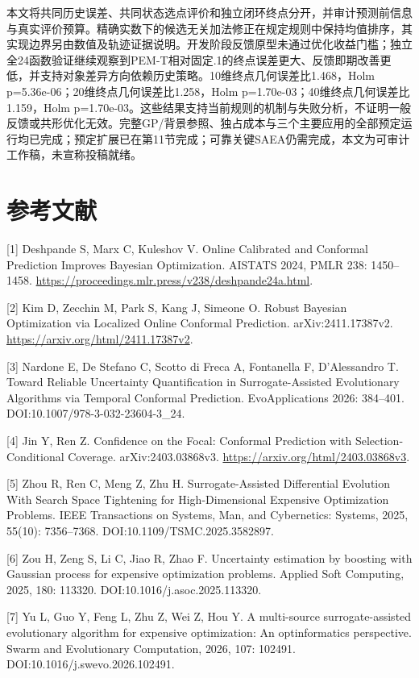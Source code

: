 \documentclass[11pt,a4paper]{article}
\begin{document}
本文将共同历史误差、共同状态选点评价和独立闭环终点分开，并审计预测前信息与真实评价预算。精确实数下的候选无关加法修正在规定规则中保持均值排序，其实现边界另由数值及轨迹证据说明。开发阶段反馈原型未通过优化收益门槛；独立全24函数验证继续观察到PEM-T相对固定.1的终点误差更大、反馈即期改善更低，并支持对象差异方向依赖历史策略。10维终点几何误差比1.468，Holm
p=5.36e-06；20维终点几何误差比1.258，Holm
p=1.70e-03；40维终点几何误差比1.159，Holm
p=1.70e-03。这些结果支持当前规则的机制与失败分析，不证明一般反馈或共形优化无效。完整GP/背景参照、独占成本与三个主要应用的全部预定运行均已完成；预定扩展已在第11节完成；可靠关键SAEA仍需完成，本文为可审计工作稿，未宣称投稿就绪。

\hypertarget{ux53c2ux8003ux6587ux732e}{%
\section{参考文献}\label{ux53c2ux8003ux6587ux732e}}

{[}1{]} Deshpande S, Marx C, Kuleshov V. Online Calibrated and Conformal
Prediction Improves Bayesian Optimization. AISTATS 2024, PMLR 238:
1450--1458. \url{https://proceedings.mlr.press/v238/deshpande24a.html}.

{[}2{]} Kim D, Zecchin M, Park S, Kang J, Simeone O. Robust Bayesian
Optimization via Localized Online Conformal Prediction.
arXiv:2411.17387v2. \url{https://arxiv.org/html/2411.17387v2}.

{[}3{]} Nardone E, De Stefano C, Scotto di Freca A, Fontanella F,
D'Alessandro T. Toward Reliable Uncertainty Quantification in
Surrogate-Assisted Evolutionary Algorithms via Temporal Conformal
Prediction. EvoApplications 2026: 384--401.
DOI:10.1007/978-3-032-23604-3\_24.

{[}4{]} Jin Y, Ren Z. Confidence on the Focal: Conformal Prediction with
Selection-Conditional Coverage. arXiv:2403.03868v3.
\url{https://arxiv.org/html/2403.03868v3}.

{[}5{]} Zhou R, Ren C, Meng Z, Zhu H. Surrogate-Assisted Differential
Evolution With Search Space Tightening for High-Dimensional Expensive
Optimization Problems. IEEE Transactions on Systems, Man, and
Cybernetics: Systems, 2025, 55(10): 7356--7368.
DOI:10.1109/TSMC.2025.3582897.

{[}6{]} Zou H, Zeng S, Li C, Jiao R, Zhao F. Uncertainty estimation by
boosting with Gaussian process for expensive optimization problems.
Applied Soft Computing, 2025, 180: 113320.
DOI:10.1016/j.asoc.2025.113320.

{[}7{]} Yu L, Guo Y, Feng L, Zhu Z, Wei Z, Hou Y. A multi-source
surrogate-assisted evolutionary algorithm for expensive optimization: An
optinformatics perspective. Swarm and Evolutionary Computation, 2026,
107: 102491. DOI:10.1016/j.swevo.2026.102491.
\end{document}
